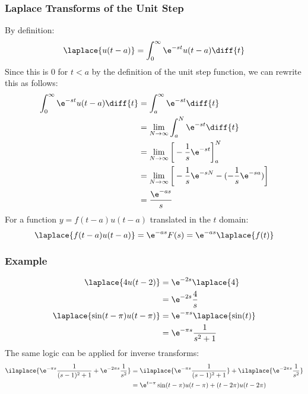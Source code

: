 \documentclass{math}
\begin{document}
\subsubsection*{Laplace Transforms of the Unit Step}
By definition:
\[ \laplace{u(t-a)} = \int_{0}^{\infty}\e^{-st}u(t-a)\diff{t} \]
Since this is 0 for \( t<a \) by the definition of the unit step function, we
can rewrite this as follows:
\begin{align*}
  \int_{0}^{\infty}\e^{-st}u(t-a)\diff{t} &=
    \int_{a}^{\infty}\e^{-st}\diff{t} \\
  &= \lim_{N\to\infty}\int_{a}^{N}\e^{-st}\diff{t} \\
  &= \lim_{N\to\infty}\bigg[-\frac{1}{s}\e^{-st}\bigg]_{a}^{N} \\
  &= \lim_{N\to\infty}\bigg[-\frac{1}{s}\e^{-sN}-(-\frac{1}{s}\e^{-sa})\bigg] \\
  &= \frac{\e^{-as}}{s}
\end{align*}
For a function \( y = f(t-a)u(t-a) \) translated in the \( t \) domain:
\[ \laplace{f(t-a)u(t-a)} = \e^{-as}F(s) = \e^{-as}\laplace{f(t)} \]

\subsubsection*{Example}
\begin{align*}
  \laplace{4u(t-2)} &= \e^{-2s}\laplace{4} \\
  &= \e^{-2s}\frac{4}{s} \\
  \laplace{\sin(t-\pi)u(t-\pi)} &= \e^{-\pi s}\laplace{\sin(t)} \\
  &= \e^{-\pi s}\frac{1}{s^2+1}
\end{align*}
The same logic can be applied for inverse transforms:
\begin{align*}
  \ilaplace{\e^{-\pi s}\frac{1}{(s-1)^2+1}+\e^{-2\pi s}\frac{1}{s^2}} &=
    \ilaplace{\e^{-\pi s}\frac{1}{(s-1)^2+1}}+
    \ilaplace{\e^{-2\pi s}\frac{1}{s^2}} \\
  &= \e^{t-\pi}\sin(t-\pi)u(t-\pi)+(t-2\pi)u(t-2\pi)
\end{align*}
\end{document}
